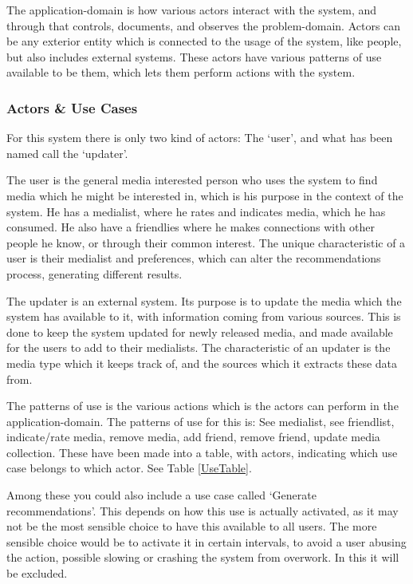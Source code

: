 The application-domain is how various actors interact with the system, and through that controls, documents, and observes the problem-domain. Actors can be any exterior entity which is connected to the usage of the system, like people, but also includes external systems. These actors have various patterns of use available to be them, which lets them perform actions with the system.

\subsubsection{Actors \& Use Cases}

For this system there is only two kind of actors: The ‘user’, and what has been named call the ‘updater’.

The user is the general media interested person who uses the system to find media which he might be interested in, which is his purpose in the context of the system. He has a medialist, where he rates and indicates media, which he has consumed. He also have a friendlies where he makes connections with other people he know, or through their common interest. The unique characteristic of a user is their medialist and preferences, which can alter the recommendations process, generating different results.

The updater is an external system. Its purpose is to update the media which the system has available to it, with information coming from various sources. This is done to keep the system updated for newly released media, and made available for the users to add to their medialists. The characteristic of an updater is the media type which it keeps track of, and the sources which it extracts these data from.

The patterns of use is the various actions which is the actors can perform in the application-domain. The patterns of use for this is: See medialist, see friendlist, indicate/rate media, remove media, add friend, remove friend, update media collection. These have been made into a table, with actors, indicating which use case belongs to which actor. See Table \ref{UseTable}.

Among these you could also include a use case called ‘Generate recommendations’. This depends on how this use is actually activated, as it may not be the most sensible choice to have this available to all users. The more sensible choice would be to activate it in certain intervals, to avoid a user abusing the action, possible slowing or crashing the system from overwork. In this it will be excluded.

